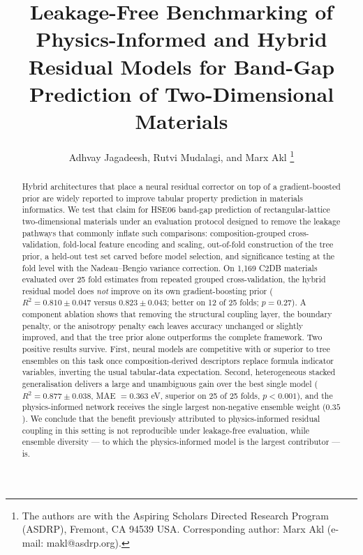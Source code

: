 \documentclass[journal]{IEEEtran}
\begin{document}
\title{Leakage-Free Benchmarking of Physics-Informed and Hybrid Residual Models
for Band-Gap Prediction of Two-Dimensional Materials}

\author{Adhvay Jagadeesh, Rutvi Mudalagi, and Marx Akl%
\thanks{The authors are with the Aspiring Scholars Directed Research Program
(ASDRP), Fremont, CA 94539 USA. Corresponding author: Marx Akl
(e-mail: makl@asdrp.org).}}


\maketitle

\begin{abstract}
Hybrid architectures that place a neural residual corrector on top of a
gradient-boosted prior are widely reported to improve tabular property
prediction in materials informatics. We test that claim for HSE06 band-gap
prediction of rectangular-lattice two-dimensional materials under an evaluation
protocol designed to remove the leakage pathways that commonly inflate such
comparisons: composition-grouped cross-validation, fold-local feature encoding
and scaling, out-of-fold construction of the tree prior, a held-out test set
carved before model selection, and significance testing at the fold level with
the Nadeau--Bengio variance correction. On 1{,}169 C2DB materials evaluated over
25 fold estimates from repeated grouped cross-validation, the hybrid residual
model does \emph{not} improve on its own gradient-boosting prior
($R^2 = 0.810 \pm 0.047$ versus $0.823 \pm 0.043$; better on 12 of 25 folds;
$p = 0.27$). A component ablation shows that removing the structural coupling
layer, the boundary penalty, or the anisotropy penalty each leaves accuracy
unchanged or slightly improved, and that the tree prior alone outperforms the
complete framework. Two positive results survive. First, neural models are
competitive with or superior to tree ensembles on this task once
composition-derived descriptors replace formula indicator variables, inverting
the usual tabular-data expectation. Second, heterogeneous stacked generalisation
delivers a large and unambiguous gain over the best single model
($R^2 = 0.877 \pm 0.038$, MAE $= 0.363$ eV, superior on 25 of 25 folds,
$p < 0.001$), and the physics-informed network receives the single largest
non-negative ensemble weight ($0.35$). We conclude that the benefit previously
attributed to physics-informed residual coupling in this setting is not
reproducible under leakage-free evaluation, while ensemble diversity --- to
which the physics-informed model is the largest contributor --- is.
\end{abstract}
\end{document}
